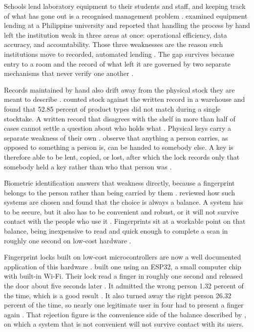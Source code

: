 

Schools lend laboratory equipment to their students and staff, and keeping track
of what has gone out is a recognised management problem
\parencite{cepeda2025}. \textcite{cepeda2025} examined equipment lending at a
Philippine university and reported that handling the process by hand left the
institution weak in three areas at once: operational efficiency, data accuracy,
and accountability. Those three weaknesses are the reason such institutions move
to recorded, automated lending \parencite{cepeda2025}. The gap survives because
entry to a room and the record of what left it are governed by two separate
mechanisms that never verify one another \parencite{cepeda2025}.

Records maintained by hand also drift away from the physical stock they are
meant to describe \parencite{linuwih2025}. \textcite{linuwih2025} counted stock
against the written record in a warehouse and found that 52.85 percent of
product types did not match during a single stocktake. A written record that
disagrees with the shelf in more than half of cases cannot settle a question
about who holds what \parencite{linuwih2025}. Physical keys carry a separate
weakness of their own \parencite{alrawili2024}. \textcite{alrawili2024} observe
that anything a person carries, as opposed to something a person is, can be
handed to somebody else. A key is therefore able to be lent, copied, or lost,
after which the lock records only that somebody held a key rather than who that
person was \parencite{alrawili2024}.

Biometric identification answers that weakness directly, because a fingerprint
belongs to the person rather than being carried by them
\parencite{alrawili2024}. \textcite{alrawili2024} reviewed how such systems are
chosen and found that the choice is always a balance. A system has to be
secure, but it also has to be convenient and robust, or it will not survive
contact with the people who use it \parencite{alrawili2024}. Fingerprints sit at
a workable point on that balance, being inexpensive to read and quick enough to
complete a scan in roughly one second on low-cost hardware
\parencite{alsayaydeh2025}.

Fingerprint locks built on low-cost microcontrollers are now a well documented
application of this hardware \parencite{rahman2026}.
\textcite{alsayaydeh2025} built one using an ESP32, a small computer chip with
built-in Wi-Fi. Their lock read a finger in roughly one second and released the
door about five seconds later \parencite{alsayaydeh2025}. It admitted the wrong
person 1.32 percent of the time, which is a good result
\parencite{alsayaydeh2025}. It also turned away the right person 26.32 percent
of the time, so nearly one legitimate user in four had to present a finger again
\parencite{alsayaydeh2025}. That rejection figure is the convenience side of the
balance described by \textcite{alrawili2024}, on which a system that is not
convenient will not survive contact with its users.

